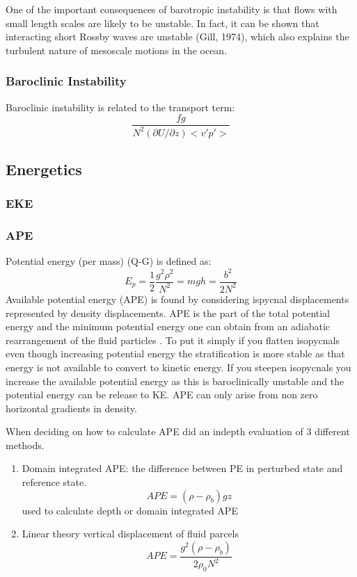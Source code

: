 One of the important consequences of barotropic instability is that flows with small length scales are likely to be unstable. In fact, it can be shown that interacting short Rossby waves are unstable (Gill, 1974), which also explains the turbulent nature of mesoscale motions in the ocean.

\subsubsection{Baroclinic Instability}
Baroclinic instability is related to the transport term:
\begin{equation}
\frac{fg}{N^2 (\partial U/ \partial z)<v'p'>}
\end{equation}

\subsection{Energetics}
\subsubsection{EKE}
\subsubsection{APE}
Potential energy (per mass) (Q-G) is defined as:
\begin{equation}
E_p = \frac{1}{2}\frac{g^2 \rho ^2}{N^2} = mgh = \frac{b^2}{2N^2}
\label{PE}
\end{equation}
Available potential energy (APE) is found by considering ispycnal displacements represented by density displacements. APE is the part of the total potential energy and the minimum potential energy one can obtain from an adiabatic rearrangement of the fluid particles \citep{Loren}.
To put it simply if you flatten isopycnals even though increasing potential energy the stratification is more stable as that energy is not available to convert to kinetic energy. If you steepen isopycnals you increase the available potential energy as this is baroclinically unstable and the potential energy can be release to KE. APE can only arise from non zero horizontal gradients in density.

When deciding on how to calculate APE \cite{Kang2010} did an indepth evaluation of 3 different methods.

\begin{enumerate}
\item Domain integrated APE:
the difference between PE in perturbed state and reference state.
\begin{equation}
APE = (\rho -\rho _b)gz
\end{equation}
used to calculate depth or domain integrated APE
\item Linear theory vertical displacement of fluid parcels
\begin{equation}
APE = \frac{g^2 (\rho -\rho _b)}{2 \rho _0 N^2}
\end{equation}

\end{enumerate}





